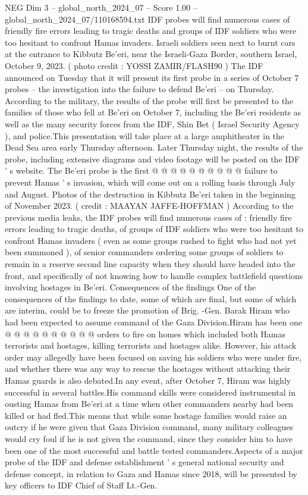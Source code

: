 \begin{textsample}{NEG Dim 3 – global\_north\_2024\_07 – Score 1.00 – global\_north\_2024\_07/110168594.txt}  \label{ex:f3_neg_377}
IDF probes will find numerous cases of friendly fire errors leading to tragic deaths and groups of IDF soldiers who were too hesitant to confront Hamas invaders.
Israeli soldiers seen next to burnt cars at the entrance to Kibbutz Be'eri, near the Israeli-Gaza Border, southern Israel, October 9, 2023. ( photo credit : YOSSI ZAMIR/FLASH90 ) The IDF announced on Tuesday that it will present its first probe in a series of October 7 probes -- the investigation into the failure to defend Be'eri -- on Thursday.
According to the military, the results of the probe will first be presented to the families of those who fell at Be'eri on October 7, including the Be'eri residents as well as the many security forces from the IDF, Shin Bet ( Israel Security Agency ), and police.This presentation will take place at a large amphitheater in the Dead Sea area early Thursday afternoon.
Later Thursday night, the results of the probe, including extensive diagrams and video footage will be posted on the IDF ' s website.
The Be'eri probe is the first @ @ @ @ @ @ @ @ @ @ failure to prevent Hamas ' s invasion, which will come out on a rolling basis through July and August.
Photos of the destruction in Kibbutz Be'eri taken in the beginning of November 2023. ( credit : MAAYAN JAFFE-HOFFMAN ) According to the previous media leaks, the IDF probes will find numerous cases of : friendly fire errors leading to tragic deaths, of groups of IDF soldiers who were too hesitant to confront Hamas invaders ( even as some groups rushed to fight who had not yet been summoned ), of senior commanders ordering some groups of soldiers to remain in a reserve second line capacity when they should have headed into the front, and specifically of not knowing how to handle complex battlefield questions involving hostages in Be'eri.
Consequences of the findings One of the consequences of the findings to date, some of which are final, but some of which are interim, could be to freeze the promotion of Brig. -Gen.
Barak Hiram who had been expected to assume command of the Gaza Division.Hiram has been one @ @ @ @ @ @ @ @ @ @ orders to fire on homes which included both Hamas terrorists and hostages, killing terrorists and hostages alike.
However, his attack order may allegedly have been focused on saving his soldiers who were under fire, and whether there was any way to rescue the hostages without attacking their Hamas guards is also debated.In any event, after October 7, Hiram was highly successful in several battles.His command skills were considered instrumental in ousting Hamas from Be'eri at a time when other commanders nearby had been killed or had fled.This means that while some hostage families would raise an outcry if he were given that Gaza Division command, many military colleagues would cry foul if he is not given the command, since they consider him to have been one of the most successful and battle tested commanders.Aspects of a major probe of the IDF and defense establishment ' s general national security and defense concept, in relation to Gaza and Hamas since 2018, will be presented by key officers to IDF Chief of Staff Lt.-Gen.

\end{textsample}
